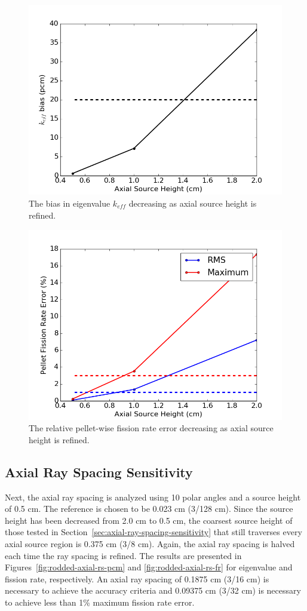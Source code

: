 \begin{figure}[h!]
	\centering
	\includegraphics[width=0.7\linewidth]{figures/results/sensitivity/rodded_source_height_pcm.png}
	\caption[]{The bias in eigenvalue $k_{\textit{eff}}$ decreasing as axial source height is refined.}
	\label{fig:rodded-axial-sh-pcm}
\end{figure}
\begin{figure}[h!]
	\centering
	\includegraphics[width=0.7\linewidth]{figures/results/sensitivity/rodded_source_height_fr.png}
	\caption[]{The relative pellet-wise fission rate error decreasing as axial source height is refined.}
	\label{fig:rodded-axial-sh-fr}
\end{figure}

\subsection{Axial Ray Spacing Sensitivity}

Next, the axial ray spacing is analyzed using 10 polar angles and a source height of 0.5 cm. The reference is chosen to be 0.023 cm (3/128 cm). Since the source height has been decreased from 2.0 cm to 0.5 cm, the coarsest source height of those tested in Section~\ref{sec:axial-ray-spacing-sensitivity} that still traverses every axial source region is 0.375 cm (3/8 cm). Again, the axial ray spacing is halved each time the ray spacing is refined. The results are presented in Figures~\ref{fig:rodded-axial-rs-pcm} and \ref{fig:rodded-axial-rs-fr} for eigenvalue and fission rate, respectively. An axial ray spacing of 0.1875 cm (3/16 cm) is necessary to achieve the accuracy criteria and 0.09375 cm (3/32 cm) is necessary to achieve less than 1\% maximum fission rate error.

